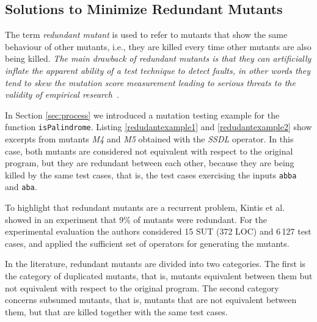 
\subsection{Solutions to Minimize Redundant Mutants}
\label{sec:opt:redundant}

The term \emph{redundant mutant} is used to refer to mutants that show the same behaviour of other mutants, i.e., they
are killed every time other mutants are also being killed. 
\emph{The main drawback of redundant mutants is that they can artificially inflate the apparent ability of a test technique to detect faults, in other words they tend to skew the mutation score measurement leading to serious threats to the validity of empirical research}~\cite{papadakis2016threats}.




In Section \ref{sec:process} we introduced a mutation testing example for the function \texttt{isPalindrome}. 
Listing \ref{redudantexample1} and \ref{redudantexample2} show excerpts from mutants \textit{M4} and \textit{M5} obtained with the \textit{SSDL} operator. In this case, both mutants are considered not equivalent with respect to the original program, but they are redundant between each other, because they are being killed by the same test cases, that is, the test cases exercising the inputs \texttt{abba} and \texttt{aba}.


To highlight that redundant mutants are a recurrent problem, Kintis et al. \cite{kintis2010evaluating} showed in an experiment that 9\% of mutants were redundant. For the experimental evaluation the authors considered 15 SUT (372 LOC) and 6\,127 test cases, and applied the sufficient set of operators for generating the mutants. 

In the literature, redundant mutants are divided into two categories. The first is the category of duplicated mutants, that is, mutants equivalent between them but not equivalent with respect to the original program. The second category concerns subsumed mutants, that is, mutants that are not equivalent between them, but that are killed together with the same test cases. 

